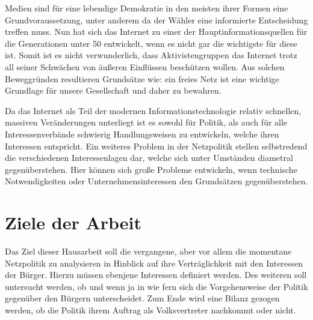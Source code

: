 \documentclass[
	12pt,
	a4paper,
	BCOR10mm,
	DIV14,
	listof=totoc,
	bibliography=totoc,
	headsepline
]{scrreprt}
\begin{document}
Medien sind für eine lebendige Demokratie in den meisten ihrer Formen eine Grundvoraussetzung, unter anderem da der Wähler eine informierte Entscheidung treffen muss.
Nun hat sich das Internet zu einer der Hauptinformationsquellen für die Generationen unter 50 entwickelt, wenn es nicht gar die wichtigste für diese ist.
Somit ist es nicht verwunderlich, dass Aktivistengruppen das Internet trotz all seiner Schwächen von äußeren Einflüssen beschützen wollen.
Aus solchen Beweggründen resultieren Grundsätze wie: ein freies Netz ist eine wichtige Grundlage für unsere Gesellschaft und daher zu bewahren. 

Da das Internet als Teil der modernen Informationstechnologie relativ schnellen, massiven Veränderungen unterliegt ist es sowohl für Politik, als auch für alle Interessenverbände schwierig Handlungsweisen zu entwickeln, welche ihren Interessen entspricht.
Ein weiteres Problem in der Netzpolitik stellen selbstredend die verschiedenen Interessenlagen dar, welche sich unter Umständen diametral gegenüberstehen.
Hier können sich große Probleme entwickeln, wenn technische Notwendigkeiten oder Unternehmensinteressen den Grundsätzen gegenüberstehen.

{}

\section{Ziele der Arbeit}
\label{aims}
Das Ziel dieser Hausarbeit soll die vergangene, aber vor allem die momentane Netzpolitik zu analysieren in Hinblick auf ihre Verträglichkeit mit den Interessen der Bürger.
Hierzu müssen ebenjene Interessen definiert werden.
Des weiteren soll untersucht werden, ob und wenn ja in wie fern sich die Vorgehensweise der Politik gegenüber den Bürgern unterscheidet.
Zum Ende wird eine Bilanz gezogen werden, ob die Politik ihrem Auftrag als Volksvertreter nachkommt oder nicht.

\end{document}
